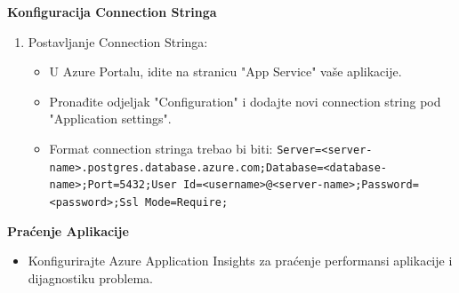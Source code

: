 				\textbf{Konfiguracija Connection Stringa}
				\begin{enumerate}
					\item Postavljanje Connection Stringa:
					\begin{itemize}
						\item U Azure Portalu, idite na stranicu "App Service" vaše aplikacije.
						\item Pronađite odjeljak "Configuration" i dodajte novi connection string pod "Application settings".
						\item Format connection stringa trebao bi biti: \texttt{Server=<server-name>.postgres.database.azure.com;Database=<database-name>;Port=5432;User Id=<username>@<server-name>;Password=<password>;Ssl Mode=Require;}
					\end{itemize}
				\end{enumerate}

				\textbf{Praćenje Aplikacije}
				\begin{itemize}
					\item Konfigurirajte Azure Application Insights za praćenje performansi aplikacije i dijagnostiku problema.
				\end{itemize}

			